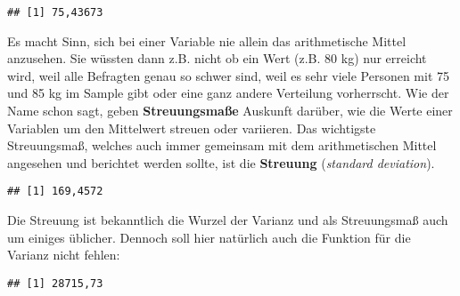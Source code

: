 \documentclass[
]{book}
\newenvironment{Shaded}{\begin{snugshade}}{\end{snugshade}}
\newcommand{\AttributeTok}[1]{\textcolor[rgb]{0.77,0.63,0.00}{#1}}
\newcommand{\ConstantTok}[1]{\textcolor[rgb]{0.00,0.00,0.00}{#1}}
\newcommand{\FloatTok}[1]{\textcolor[rgb]{0.00,0.00,0.81}{#1}}
\newcommand{\FunctionTok}[1]{\textcolor[rgb]{0.00,0.00,0.00}{#1}}
\newcommand{\NormalTok}[1]{#1}
\newcommand{\SpecialCharTok}[1]{\textcolor[rgb]{0.00,0.00,0.00}{#1}}
\begin{document}
\begin{Shaded}
\end{Shaded}

\begin{verbatim}
## [1] 75,43673
\end{verbatim}

Es macht Sinn, sich bei einer Variable nie allein das arithmetische Mittel anzusehen. Sie wüssten dann z.B. nicht ob ein Wert (z.B. 80 kg) nur erreicht wird, weil alle Befragten genau so schwer sind, weil es sehr viele Personen mit 75 und 85 kg im Sample gibt oder eine ganz andere Verteilung vorherrscht. Wie der Name schon sagt, geben \textbf{Streuungsmaße} Auskunft darüber, wie die Werte einer Variablen um den Mittelwert streuen oder variieren. Das wichtigste Streuungsmaß, welches auch immer gemeinsam mit dem arithmetischen Mittel angesehen und berichtet werden sollte, ist die \textbf{Streuung} (\emph{standard deviation}).

\begin{Shaded}
\end{Shaded}

\begin{verbatim}
## [1] 169,4572
\end{verbatim}

Die Streuung ist bekanntlich die Wurzel der Varianz und als Streuungsmaß auch um einiges üblicher. Dennoch soll hier natürlich auch die Funktion für die Varianz nicht fehlen:

\begin{Shaded}
\end{Shaded}

\begin{verbatim}
## [1] 28715,73
\end{verbatim}
\end{document}
